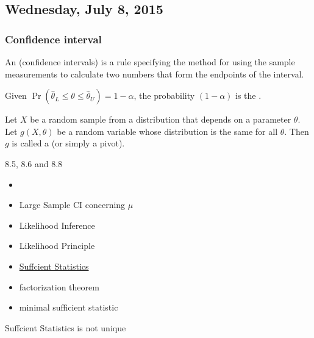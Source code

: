 \subsection{Wednesday, July 8, 2015}


\subsubsection{Confidence interval}

An (confidence intervals) is a rule specifying the method for using the sample measurements to calculate two numbers that form the endpoints of the interval.

Given $\Pr(\hat{\theta}_L\leq\theta\leq\hat{\theta}_U) = 1-\alpha$, the probability $(1-\alpha)$ is the .

Let $X$  be a random sample from a distribution that depends on a parameter $\theta$.
Let $g(X,\theta)$ be a random variable whose distribution is the same for all  $\theta$.
Then $g$ is called a  (or simply a pivot).

8.5, 8.6 and 8.8

\begin{itemize}
\item {}
\item Large Sample CI concerning $\mu$
\item Likelihood Inference
\item Likelihood Principle
\item \href{https://en.wikipedia.org/wiki/Sufficient_statistic}{Suffcient Statistics}
\item factorization theorem
\item minimal sufficient statistic
\end{itemize}

Suffcient Statistics is not unique
